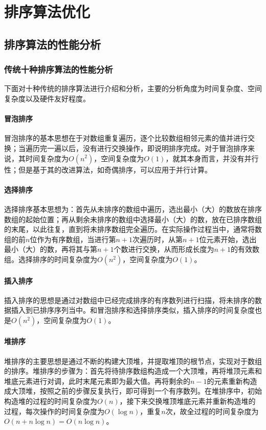 
\chapter{排序算法优化}

\section{排序算法的性能分析}
\subsection{传统十种排序算法的性能分析}
下面对十种传统的排序算法进行介绍和分析，主要的分析角度为时间复杂度、空间复杂度以及硬件友好程度。

\subsubsection{冒泡排序}
    冒泡排序的基本思想在于对数组重复遍历，逐个比较数组相邻元素的值并进行交换；当遍历完一遍以后，没有进行交换操作，即说明排序完成。对于冒泡排序来说，其时间复杂度为$O(n^2)$，空间复杂度为$O(1)$，就其本身而言，并没有并行性；但是基于其的改进算法，如奇偶排序，可以应用于并行计算。

\subsubsection{选择排序}
    选择排序基本思想为：首先从未排序的数组中遍历，选出最小（大）的数放在排序数组的起始位置；再从剩余未排序的数组中选择最小（大）的数，放在已排序数组的末尾，以此往复，直到将未排序数组完全遍历。在实际操作过程当中，通常将数组的前$n$位作为有序数组，当进行第$n+1$次遍历时，从第$n+1$位元素开始，选出最小（大）的数，再将其与第$n+1$个数进行交换，从而形成长度为$n+1$的有效数组。选择排序的时间复杂度为$O(n^2)$，空间复杂度为$O(1)$。

\subsubsection{插入排序}
    插入排序的思想是通过对数组中已经完成排序的有序数列进行扫描，将未排序的数据插入到已排序序列当中。和冒泡排序和选择排序类似，插入排序的时间复杂度也是$O(n^2)$，空间复杂度为$O(1)$。

\subsubsection{堆排序}
    堆排序的主要思想是通过不断的构建大顶堆，并提取堆顶的根节点，实现对于数组的排序。堆排序的步骤为：首先将待排序数组构造成一个大顶堆，再将堆顶元素和堆底元素进行对调，此时末尾元素即为最大值。再将剩余的$n-1$的元素重新构造成大顶堆，按照之前的步骤反复执行，即可得到一个有序数列。在堆排序中，初始构造堆的过程的时间复杂度为$O(n)$，接下来交换堆顶堆底元素并重新构造堆的过程，每次操作的时间复杂度为$O(\log n)$，重复$n$次，故全过程的时间复杂度为$O(n+n\log n)=O(n\log n)$。

